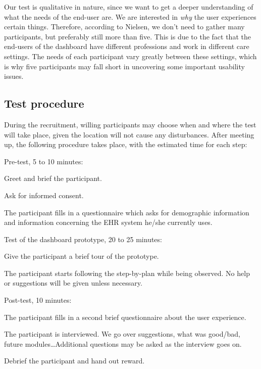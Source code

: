     Our test is qualitative in nature, since we want to get a deeper understanding of what the needs of the end-user are. We are interested in \emph{why} the user experiences certain things. Therefore, according to Nielsen, we don't need to gather many participants, but preferably still more than five. This is due to the fact that the end-users of the dashboard have different professions and work in different care settings. The needs of each participant vary greatly between these settings, which is why five participants may fall short in uncovering some important usability issues.

    \subsection{Test procedure}

    During the recruitment, willing participants may choose when and where the test will take place, given the location will not cause any disturbances. After meeting up, the following procedure takes place, with the estimated time for each step:
    \begin{myenumerate}
        \item Pre-test, 5 to 10 minutes:
        \begin{myenumerate}
            \item Greet and brief the participant.
            \item Ask for informed consent.
            \item The participant fills in a questionnaire which asks for demographic information and information concerning the EHR system he/she currently uses.
        \end{myenumerate}
        \item Test of the dashboard prototype, 20 to 25 minutes:
        \begin{myenumerate}
            \item Give the participant a brief tour of the prototype.
            \item The participant starts following the step-by-plan while being observed. No help or suggestions will be given unless necessary.
        \end{myenumerate}
        \item Post-test, 10 minutes:
        \begin{myenumerate}
            \item The participant fills in a second brief questionnaire about the user experience.
            \item The participant is interviewed. We go over suggestions, what was good/bad, future modules\ldots Additional questions may be asked as the interview goes on.
            \item Debrief the participant and hand out reward.
        \end{myenumerate}
    \end{myenumerate}

